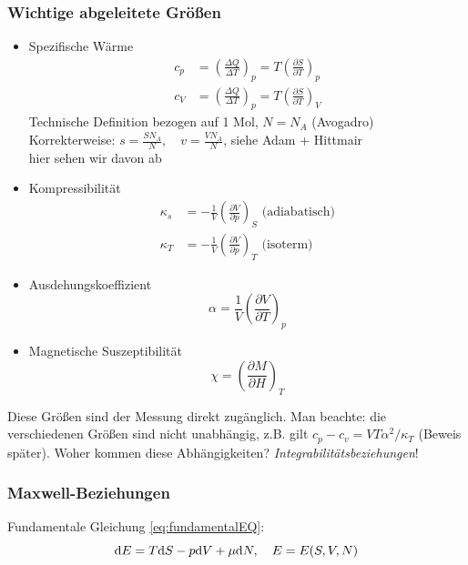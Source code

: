 \subsubsection{Wichtige abgeleitete Größen}
\begin{itemize}
  \item Spezifische Wärme
    \begin{equation}
  	\begin{split}
  	  c_p &= \left( \frac{\Delta Q}{\Delta T} \right)_p = T \left( \frac{\partial S}{\partial T} \right)_p \\
  	  c_V &= \left( \frac{\Delta Q}{\Delta T} \right)_p = T \left( \frac{\partial S}{\partial T} \right)_V
  	\end{split}
    \end{equation}
    Technische Definition bezogen auf 1 Mol, $N=N_A$ (Avogadro) \\
    Korrekterweise: $s = \frac{S N_A}{N}, \quad v = \frac{V N_A}{N}$, siehe Adam + Hittmair \\
    hier sehen wir davon ab
  \item Kompressibilität
    \begin{equation}
   	\begin{split}
  	  \kappa_s &= - \frac{1}{V} \left( \frac{\partial V}{\partial p} \right)_S \text{ (adiabatisch)} \\
  	  \kappa_T &= - \frac{1}{V} \left( \frac{\partial V}{\partial p} \right)_T \text{ (isoterm)}
    \end{split}
	\end{equation}
  \item Ausdehungskoeffizient
  \begin{equation}
  	\alpha = \frac{1}{V} \left( \frac{\partial V}{\partial T} \right)_p
  \end{equation}
  \item Magnetische Suszeptibilität
  \begin{equation}
  	\chi = \left( \frac{\partial M}{\partial H} \right)_T
  \end{equation}
\end{itemize}
Diese Größen sind der Messung direkt zugänglich. Man beachte: die verschiedenen Größen sind nicht unabhängig, z.B. gilt 
$c_p - c_v = V T \alpha^2 / \kappa_T$ (Beweis später).
Woher kommen diese Abhängigkeiten? \emph{Integrabilitätsbeziehungen}!
\subsubsection{Maxwell-Beziehungen}
Fundamentale Gleichung \eqref{eq:fundamentalEQ}:
\begin{equation}
  \mathrm{d} E = T \mathrm{d} S - p \mathrm{d} V + \mu \mathrm{d} N, \quad E=E(S, V, N)
\end{equation}
